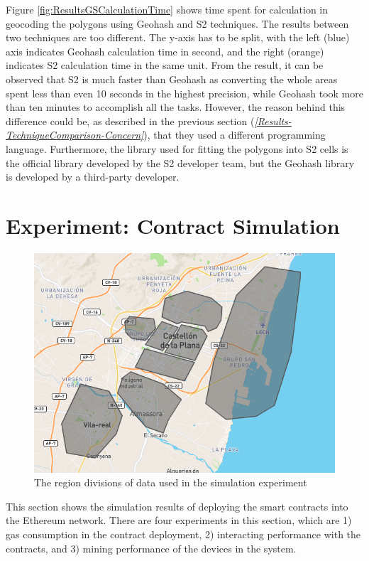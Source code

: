 \npara Figure \ref{fig:ResultsGSCalculationTime} shows time spent for calculation in geocoding the polygons using Geohash and S2 techniques.
The results between two techniques are too different.
The y-axis has to be split, with the left (blue) axis indicates Geohash calculation time in second, and the right (orange) indicates S2 calculation time in the same unit.
From the result, it can be observed that S2 is much faster than Geohash as converting the whole areas spent less than even 10 seconds in the highest precision, while Geohash took more than ten minutes to accomplish all the tasks.
However, the reason behind this difference could be, as described in the previous section (\textit{\ref{Results-TechniqueComparison-Concern}}), that they used a different programming language.
Furthermore, the library used for fitting the polygons into S2 cells is the official library developed by the S2 developer team, but the Geohash library is developed by a third-party developer.
\newpage

\section{Experiment: Contract Simulation} \label{Results-Simulation}

\begin{figure}[hbt!]
  \centering
  \includegraphics[width=\textwidth]{images/ExperimentInput.png}
  \caption{The region divisions of data used in the simulation experiment}
  \label{fig:ExperimentInput}
\end{figure}

\npara This section shows the simulation results of deploying the smart contracts into the Ethereum network.
There are four experiments in this section, which are 1) gas consumption in the contract deployment, 2) interacting performance with the contracts, and 3) mining performance of the devices in the system.

